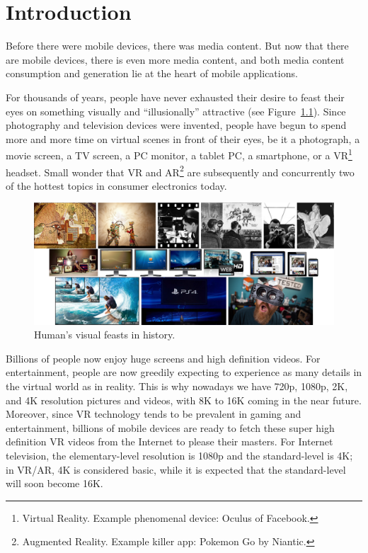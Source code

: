 \chapter{Introduction}\label{sec-introduction}
Before there were mobile devices, there was media content. But now that there are mobile devices, 
there is even more media content, and both media content consumption and generation lie at the heart of mobile applications. 

For thousands of years, people have never exhausted their desire to feast their eyes on something visually and ``illusionally'' attractive (see Figure~\ref{fig:visual-feasts}). 
Since photography and television devices were invented, people have begun to spend more and more time on virtual scenes in front of their eyes, be it a photograph, a movie screen, a TV screen, a PC monitor, a tablet PC, a smartphone, or a VR\footnote{Virtual Reality. Example phenomenal device: Oculus of Facebook.} headset.  
Small wonder that VR and AR\footnote{Augmented Reality. Example killer app: Pokemon Go by Niantic.} are subsequently and concurrently two of the hottest topics in consumer electronics today. 
\begin{figure}[ht]
	\centering
	\includegraphics[width=\linewidth]{fig/general/visual-feasts.png}
	\caption{Human's visual feasts in history.}\label{fig:visual-feasts}
\end{figure}

Billions of people now enjoy huge screens and high definition videos. For entertainment,  people are now greedily expecting to experience as many details in the virtual world as in reality. 
This is why nowadays we have 720p, 1080p, 2K, and 4K resolution pictures and videos, with 8K to 16K coming in the near future. 
Moreover, since VR technology tends to be prevalent in gaming and entertainment, billions of mobile devices are ready to fetch these super high definition VR videos from the Internet to please their masters. 
For Internet television, the elementary-level resolution is 1080p and the standard-level is 4K; in VR/AR, 4K is considered basic, while it is expected that the standard-level will soon become 16K. 


